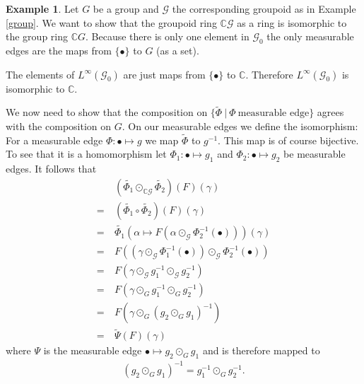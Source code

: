 \documentclass[12pt,a4paper]{scrartcl}
\theoremstyle{plain}
\theoremstyle{definition}
\newtheorem{Example}[Theorem]{Example}
\newcommand{\C}{\mathbb{C}} %
\newcommand{\2}{\mathbb{Z} / 2 \mathbb{Z}}
\newcommand{\G}{\mathcal{G}}
\newcommand{\1}{\bar{1}}
\newcommand{\0}{\bar{0}}
\begin{document}
\begin{Example} \label{groupoid_ring_of_groups}
	Let $G$ be a group and $\G$ the corresponding groupoid as in Example \ref{group}. We want to show that the groupoid ring $\C \G$ as a ring is isomorphic to the group ring $\C G$. Because there is only one element in $\G_0$ the only measurable edges are the maps from $\{\bullet\}$ to $G$ (as a set). 
	
	The elements of $L^\infty(\G_0)$ are just maps from $\{\bullet \}$ to $\C$. Therefore  $L^\infty(\G_0)$ is isomorphic to $\C$. 
	
	We now need to show that the composition on $\{\tilde{\Phi}~|~ \Phi~\text{measurable edge}\}$ agrees with the composition on $G$.
	On our measurable edges we define the isomorphism: For a measurable edge $\Phi\colon\bullet \mapsto g$ we map $\tilde{\Phi}$ to $g^{-1}$. This map is of course bijective. To see that it is a homomorphism let $\Phi_1\colon\bullet \mapsto g_1$ and $\Phi_2\colon\bullet \mapsto g_2$ be measurable edges. It follows that
	\begin{align*}
		  &~ (\widetilde{\Phi_1} \odot_{\C \G} \widetilde{\Phi_2})(F)(\gamma) \\
		= &~ (\widetilde{\Phi_1} \circ \widetilde{\Phi_2})(F)(\gamma) \\
		= &~ \widetilde{\Phi_1} (\alpha \mapsto F(\alpha \odot_{\G}\Phi_2^{-1}(\bullet)))(\gamma) \\
		= &~ F((\gamma \odot_{\G} \Phi_1^{-1}(\bullet)) \odot_{\G} \Phi_2^{-1}(\bullet)) \\
		= &~ F(\gamma \odot_\G g_1^{-1} \odot_\G g_2^{-1}) \\
		= &~ F(\gamma \odot_G g_1^{-1} \odot_G g_2^{-1}) \\
		= &~ F(\gamma \odot_G (g_2 \odot_G g_1)^{-1}) \\
		= &~ \tilde{\Psi} (F)(\gamma)
	\end{align*}
	where $\Psi$ is the measurable edge $\bullet \mapsto g_2 \odot_G g_1$ and is therefore mapped to 
	\begin{align*}
		(g_2 \odot_G g_1)^{-1} = g_1^{-1} \odot_G g_2^{-1}.
	\end{align*}
\end{Example}
\end{document}
